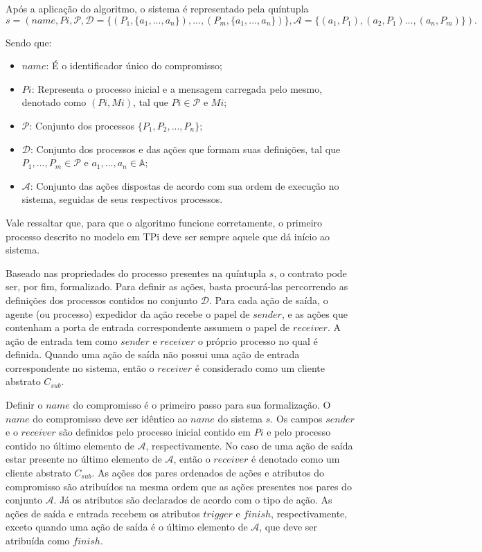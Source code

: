 Após a aplicação do algoritmo, o sistema é representado pela quíntupla $$s = (name, Pi, \mathcal{P}, \mathcal{D} = \{(P_{1}, \{a_{1},...,a_{n}\}), ..., (P_{m}, \{a_{1},...,a_{n}\})\}, \mathcal{A} = \{(a_{1}, P_{1}), (a_{2}, P_{1})..., (a_{n}, P_{m})\}).$$

Sendo que:
\begin{itemize}
	\item $name$: É o identificador único do compromisso;
	\item $Pi$: Representa o processo inicial e a mensagem carregada pelo mesmo, denotado como $(Pi, Mi)$, tal que $Pi \in \mathcal{P}$ e $Mi$;
	\item $\mathcal{P}$: Conjunto dos processos $\{P_{1}, P_{2}, ..., P_{n}\}$;
	\item $\mathcal{D}$: Conjunto dos processos e das ações que formam suas definições, tal que $P_{1}, ..., P_{m} \in \mathcal{P}$ e $a_{1}, ..., a_{n} \in \mathbb{A}$;
	\item $\mathcal{A}$: Conjunto das ações dispostas de acordo com sua ordem de execução no sistema, seguidas de seus respectivos processos.
\end{itemize}

Vale ressaltar que, para que o algoritmo funcione corretamente, o primeiro processo descrito no modelo em TPi deve ser sempre aquele que dá início ao sistema. 

Baseado nas propriedades do processo presentes na quíntupla $s$, o contrato pode ser, por fim, formalizado. Para definir as ações, basta procurá-las percorrendo as definições dos processos contidos no conjunto $\mathcal{D}$. Para cada ação de saída, o agente (ou processo) expedidor da ação recebe o papel de $sender$, e as ações que contenham a porta de entrada correspondente assumem o papel de $receiver$. A ação de entrada tem como $sender$ e $receiver$ o próprio processo no qual é definida. Quando uma ação de saída não possui uma ação de entrada correspondente no sistema, então o $receiver$ é considerado como um cliente abstrato $C_{sub}$.

Definir o $name$ do compromisso é o primeiro passo para sua formalização. O $name$ do compromisso deve ser idêntico ao $name$ do sistema $s$. Os campos $sender$ e o $receiver$ são definidos pelo processo inicial contido em $Pi$ e pelo processo contido no último elemento de $\mathcal{A}$, respectivamente. No caso de uma ação de saída estar presente no último elemento de $\mathcal{A}$, então o $receiver$ é denotado como um cliente abstrato $C_{sub}$. As ações dos pares ordenados de ações e atributos do compromisso são atribuídos na mesma ordem que as ações presentes nos pares do conjunto $\mathcal{A}$. Já os atributos são declarados de acordo com o tipo de ação. As ações de saída e entrada recebem os atributos $trigger$ e $finish$, respectivamente, exceto quando uma ação de saída é o último elemento de $\mathcal{A}$, que deve ser atribuída como $finish$.

